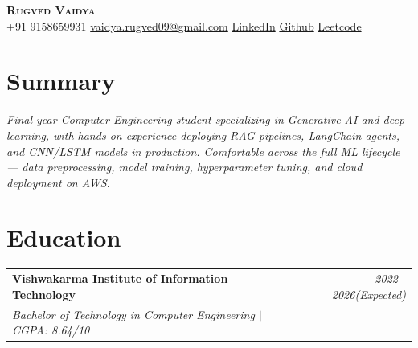 \documentclass[letterpaper,10pt]{article}
\begin{document}

\begin{center}
    \textbf{\Huge \scshape Rugved Vaidya} \\[0.5em]
    
    +91 9158659931 \;\textbullet\;
    \href{mailto:vaidya.rugved09@gmail.com}{vaidya.rugved09@gmail.com} \;\textbullet\;
    \href{https://www.linkedin.com/in/rugved-vaidya-86944325a/}{LinkedIn} \;\textbullet\;
    \href{https://github.com/RugvedVaidya}{Github} \;\textbullet\;
    \href{https://leetcode.com/u/RugvedVaidya}{Leetcode}
\end{center}


\section{Summary}
\begin{itemize}[leftmargin=0.15in, label={}]
  \small{
    \item{
      \textit{Final-year Computer Engineering student specializing in Generative AI and deep learning, with hands-on experience deploying RAG pipelines, LangChain agents, and CNN/LSTM models in production. Comfortable across the full ML lifecycle — data preprocessing, model training, hyperparameter tuning, and cloud deployment on AWS.}
    }
  }
\end{itemize}










\section{Education}
\begin{tabularx}{\linewidth}{X r}
  \textbf{Vishwakarma Institute of Information Technology} & \textit{2022 - 2026(Expected)} \\
  \textit{Bachelor of Technology in Computer Engineering $|$ CGPA: 8.64/10} & \\
\end{tabularx}



\end{document}
